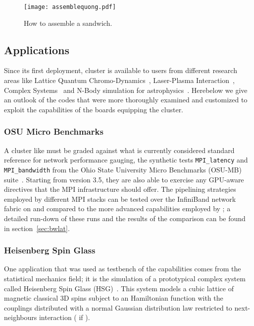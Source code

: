 \begin{figure}[!hbt]
  \centering
  \texttt{[image: assemblequong.pdf]}
  \caption{How to assemble a \quong sandwich.}
  \label{fig:quongsandwich}
\end{figure}
\FloatBarrier

\subsection{Applications}
\label{sec:applic}
Since its first deployment, \quong cluster is available to users from
different research areas like Lattice Quantum
Chromo-Dynamics~\cite{D'Elia:2012:zw}, Laser-Plasma
Interaction~\cite{Rossi:pic}, Complex Systems~\cite{Berganza:2012:xy}
and N-Body simulation for astrophysics~\cite{2012arXiv1207.2367C}.
Herebelow we give an outlook of the codes that were more thoroughly
examined and customized to exploit the \PtoP capabilities of the
\apenetp boards equipping the \quong cluster.

\subsubsection{OSU Micro Benchmarks}
A cluster like \quong must be graded against what is currently
considered standard reference for network performance gauging, \ie the
synthetic tests \texttt{MPI\_latency} and \texttt{MPI\_bandwidth} from
the Ohio State University Micro Benchmarks (OSU-MB)
suite~\cite{Traff:2012:OMB-GPU}.
Starting from version 3.5, they are also able to exercise any
GPU-aware directives that the MPI infrastructure should offer.
The pipelining strategies employed by different MPI stacks can be
tested over the InfiniBand network fabric on \quong and compared to
the more advanced \PtoP capabilities employed by \apenetp; a detailed
run-down of these runs and the results of the comparison can be found
in section~\ref{sec:bwlat}.

\subsubsection{Heisenberg Spin Glass}
One application that was used as testbench of the \apenetp
capabilities comes from the statistical mechanics field; it is the
simulation of a prototypical complex system called Heisenberg Spin
Glass (HSG)~\cite{Bernaschi20121416}.
This system models a cubic lattice of magnetic classical 3D spins
 subject to an Hamiltonian function  with the  couplings
distributed with a normal Gaussian distribution law restricted to
next-neighbours interaction ( if ).

